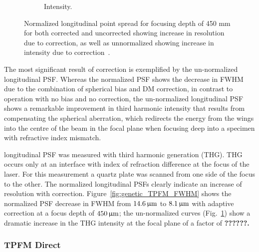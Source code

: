 \begin{figure}[tbh]
\begin{subfigure}[b]{0.45\textwidth}
                \caption{Intensity.}
                \label{fig:genetic_TPFM_intensity}
        \end{subfigure}
        \caption{Normalized longitudinal point spread for focusing depth of 450 mm for both corrected and uncorrected showing increase in resolution due to correction, as well as unnormalized showing increase in intensity due to correction~\cite{Genetic_MPFM}.}
\label{fig:genetic_TPFM}
\end{figure} 

The most significant result of correction is exemplified by the un-normalized longitudinal PSF. Whereas the normalized PSF shows the decrease in FWHM due to the combination of spherical bias and DM correction, in contrast to operation with no bias and no correction, the un-normalized longitudinal PSF shows a remarkable improvement in third harmonic intensity that results from compensating the spherical aberration, which redirects the energy from the wings into the centre of the beam in the focal plane when focusing deep into a specimen with refractive index mismatch.

longitudinal PSF was measured with third harmonic generation (THG). THG occurs only at an interface with index of refraction difference at the focus of the laser. For this measurement a quartz plate was scanned from one side of the focus to the other. The normalized longitudinal PSFs clearly indicate an increase of resolution with correction. Figure~\ref{fig:genetic_TPFM_FWHM} shows the normalized PSF decrease in FWHM from $\unit[14.6 ]{\upmu m}$ to $\unit[8.1]{\upmu m}$ with adaptive correction at a focus depth of $\unit[450]{\upmu m}$; the un-normalized curves (Fig.~\ref{fig:genetic_TPFM_intensity}) show a dramatic increase in the THG intensity at the focal plane of a factor of \textbf{??????.}


\subsubsection{TPFM Direct}
\label{sec:TPFMDirect}

